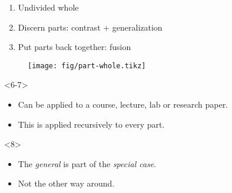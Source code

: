 \begin{frame}
  \begin{example}
    \begin{enumerate}
      \item \alert<1>{Undivided whole}
      \item \alert<2>{Discern parts}: \alert<3>{contrast} + 
        \alert<4>{generalization}
      \item Put parts back together: \alert<5>{fusion}
    \end{enumerate}
  \end{example}

  \begin{figure}
    \texttt{[image: fig/part-whole.tikz]}
  \end{figure}

  \begin{onlyenv}<6-7>
    \begin{remark}
      \begin{itemize}
        \item<6> Can be applied to a course, lecture, lab or research paper.
        \item<7> This is applied recursively to every part.
      \end{itemize}
    \end{remark}
  \end{onlyenv}

  \begin{onlyenv}<8>
    \begin{remark}[An implication]
      \begin{itemize}
        \item The \emph{general} is part of the \emph{special case}.
        \item Not the other way around.
      \end{itemize}
    \end{remark}
  \end{onlyenv}
\end{frame}

